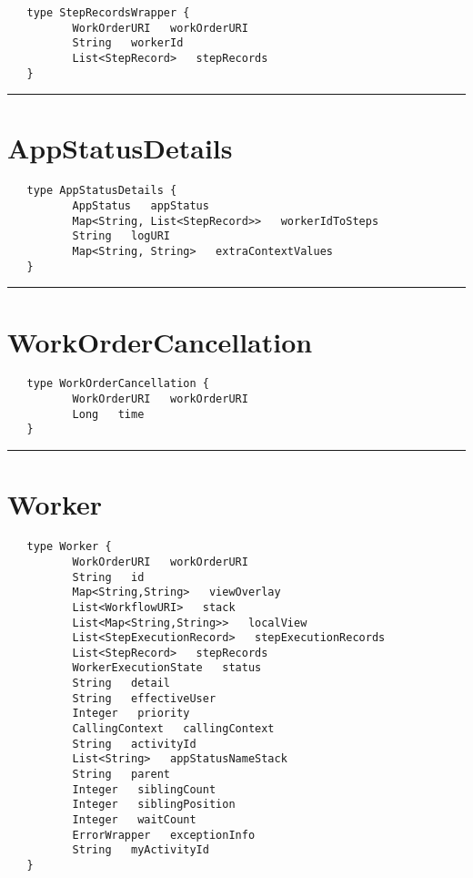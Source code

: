 \begin{verbatim}
   type StepRecordsWrapper {
          WorkOrderURI   workOrderURI
          String   workerId
          List<StepRecord>   stepRecords
   }
\end{verbatim}

\rule{15cm}{2pt}
\section{AppStatusDetails}
\label{type:AppStatusDetails}

\begin{verbatim}
   type AppStatusDetails {
          AppStatus   appStatus
          Map<String, List<StepRecord>>   workerIdToSteps
          String   logURI
          Map<String, String>   extraContextValues
   }
\end{verbatim}

\rule{15cm}{2pt}
\section{WorkOrderCancellation}
\label{type:WorkOrderCancellation}

\begin{verbatim}
   type WorkOrderCancellation {
          WorkOrderURI   workOrderURI
          Long   time
   }
\end{verbatim}

\rule{15cm}{2pt}
\section{Worker}
\label{type:Worker}

\begin{verbatim}
   type Worker {
          WorkOrderURI   workOrderURI
          String   id
          Map<String,String>   viewOverlay
          List<WorkflowURI>   stack
          List<Map<String,String>>   localView
          List<StepExecutionRecord>   stepExecutionRecords
          List<StepRecord>   stepRecords
          WorkerExecutionState   status
          String   detail
          String   effectiveUser
          Integer   priority
          CallingContext   callingContext
          String   activityId
          List<String>   appStatusNameStack
          String   parent
          Integer   siblingCount
          Integer   siblingPosition
          Integer   waitCount
          ErrorWrapper   exceptionInfo
          String   myActivityId
   }
\end{verbatim}

